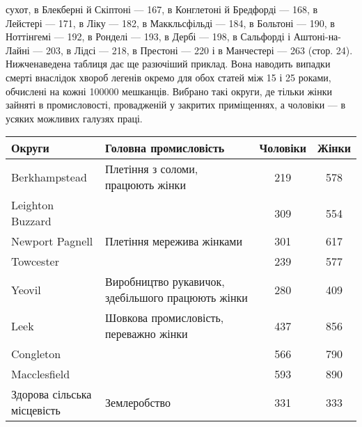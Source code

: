 \parcont{}  %
сухот, в Блекберні й Скіптоні — 167, в Конглетоні й Бредфорді —
168, в Лейстері — 171, в Ліку — 182, в Маккльсфільді — 184,
в Больтоні — 190, в Ноттінгемі — 192, в Ронделі — 193, в Дербі —
198, в Сальфорді і Аштоні-на-Лайні — 203, в Лідсі — 218, в Престоні — 220 і в Манчестері — 263
(стор. 24). Нижченаведена таблиця дає ще разючіший приклад. Вона наводить випадки смерті
внаслідок хвороб легенів окремо для обох статей між 15 і
25 роками, обчислені на кожні \num{100000} мешканців. Вибрано такі
округи, де тільки жінки зайняті в промисловості, провадженій
у закритих приміщеннях, а чоловіки — в усяких можливих галузях праці.

\begin{table}[H]
  \centering
  \small
  \begin{tabular}{l l c c}
    \toprule
    Округи &
    Головна промисловість &
    Чоловіки & Жінки \\
    \midrule

Berkhampstead    & Плетіння з соломи, працюють жінки & 219 & 578 \\
Leighton Buzzard  &                                       & 309 & 554 \\
Newport Pagnell  & Плетіння мережива жінками         & 301 & 617 \\
Towcester        &                                        & 239 & 577 \\
Yeovil           & \makecell[lb]{Виробництво рукавичок,\\здебільшого працюють жінки} & 280 & 409 \\
Leek             & \makecell[lb]{Шовкова промисловість, \\ переважно жінки} & 437 & 856 \\
Congleton        &                                             & 566 & 790 \\
Macclesfield     &                                             & 593 & 890 \\
\makecell[lb]{Здорова сільська \\ місцевість} &   Землеробство                         & 331 & 333 \\
  \end{tabular}
\end{table}

